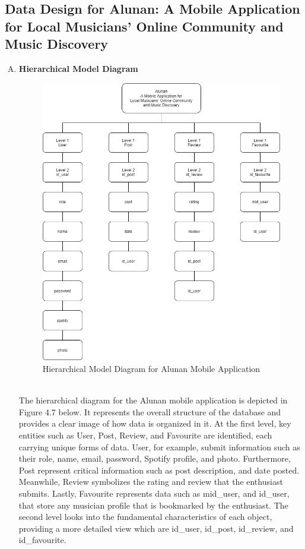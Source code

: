 \subsection{Data Design for Alunan: A Mobile Application for Local Musicians’ Online Community and Music Discovery}
\begin{enumerate}[A.]
    \item \textbf{Hierarchical Model Diagram}
    \begin{figure}[h]
        \centering
        \includegraphics[width=0.9\linewidth]{mainmatter/images/hierachical.png}
        \caption{Hierarchical Model Diagram for Alunan Mobile Application}
        \label{fig:myfig46}
    \end{figure} \\
    The hierarchical diagram for the Alunan mobile application is depicted in Figure 4.7 below. It represents the overall structure of the database and provides a clear image of how data is organized in it. At the first level, key entities such as User, Post, Review, and Favourite are identified, each carrying unique forms of data. User, for example, submit information such as their role, name, email, password, Spotify profile, and photo. Furthermore, Post represent critical information such as post description, and date posted. Meanwhile, Review symbolizes the rating and review that the enthusiast submits. Lastly, Favourite represents data such as mid\_user, and id\_user, that store any musician profile that is bookmarked by the enthusiast. The second level looks into the fundamental characteristics of each object, providing a more detailed view which are id\_user, id\_post, id\_review, and id\_favourite.


\end{enumerate}
